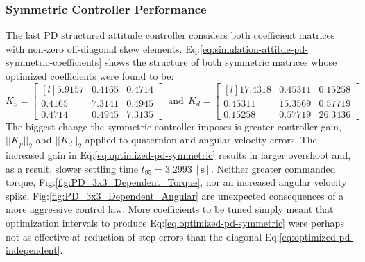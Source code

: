 \subsubsection{Symmetric Controller Performance}
\label{subsubsec:simulation.atttiude.pd.3x3}
The last PD structured attitude controller considers both coefficient matrices with non-zero off-diagonal skew elements. Eq:\ref{eq:simulation-attitde-pd-symmetric-coefficients} shows the structure of both symmetric matrices whose optimized coefficients were found to be:
\begin{equation}\label{eq:optimized-pd-symmetric}
K_p = \begin{bmatrix*}[l]
5.9157 & 0.4165 & 0.4714\\
0.4165 & 7.3141 & 0.4945\\
0.4714 & 0.4945 & 7.3135
\end{bmatrix*}
~~\text{and}~~K_d = \begin{bmatrix*}[l]
17.4318 & 0.45311 & 0.15258\\
0.45311 & 15.3569 & 0.57719\\
0.15258 & 0.57719 & 26.3436
\end{bmatrix*}
\end{equation}
The biggest change the symmetric controller imposes is greater controller gain, $||K_p||_2$ abd $||K_d||_2$ applied to quaternion and angular velocity errors. The increased gain in Eq:\ref{eq:optimized-pd-symmetric} results in larger overshoot and, as a result, slower settling time $t_{95}=3.2993~[\text{s}]$. Neither greater commanded torque, Fig:\ref{fig:PD_3x3_Dependent_Torque}, nor an increased angular velocity spike, Fig:\ref{fig:PD_3x3_Dependent_Angular} are unexpected consequences of a more aggressive control law. More coefficients to be tuned simply meant that optimization intervals to produce Eq:\ref{eq:optimized-pd-symmetric} were perhaps not as effective at reduction of step errors than the diagonal Eq:\ref{eq:optimized-pd-independent}.
